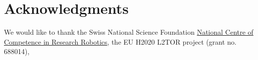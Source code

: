 \documentclass{sig-alternate-05-2015}
\begin{document}
\section{Acknowledgments}
We would like to thank the Swiss National Science Foundation 
\href{http://www.nccr-robotics.ch/}{National Centre of Competence in Research 
Robotics}, the EU H2020 L2TOR project (grant no. 688014),

\small

  
\end{document}
